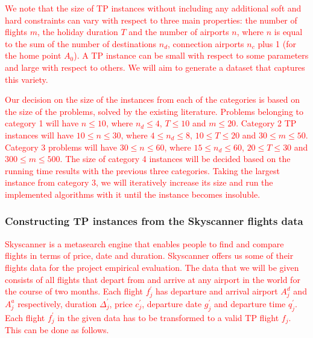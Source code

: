 \documentclass{mprop}
\theoremstyle{definition}
\begin{document}
\textcolor{red}{
We note that the size of TP instances without including any additional soft and hard constraints can vary with respect to three main properties: the number of flights $m$, the holiday duration $T$ and the number of airports $n$, where $n$ is equal to the sum of the number of destinations $n_{d}$, connection airports $n_{c}$ plus 1 (for the home point $A_{0}$). A TP instance can be small with respect to some parameters and large with respect to others. We will aim to generate a dataset that captures this variety.}%

\textcolor{red}{
Our decision on the size of the instances from each of the categories is based on  the size of the problems, solved by the existing literature. Problems belonging to category 1 will have $n \leq 10$, where $n_{d} \leq 4$, $T \leq 10$ and $m \leq 20$. Category 2 TP instances will have $10 \leq n \leq 30$, where $4 \leq n_{d} \leq 8$, $10 \leq T \leq 20$ and $30 \leq m \leq 50$. Category 3 problems will have $30 \leq n \leq 60$, where $15 \leq n_{d} \leq 60$, $20 \leq T \leq 30$ and $300 \leq m \leq 500$. The size of category 4 instances will be decided based on the running time results with the previous three categories. Taking the largest instance from category 3, we will iteratively increase its size and run the implemented algorithms with it until the instance becomes insoluble.}


\subsubsection*{Constructing TP instances from the Skyscanner flights data}
\textcolor{red}{
Skyscanner is a metasearch engine that enables people to find and compare flights in terms of price, date and duration. Skyscanner offers us some of their flights data for the project empirical evaluation. The data that we will be given consists of all flights that depart from and arrive at any airport in the world for the course of two months. Each flight $f^{\prime}_{j}$ has departure and arrival airport $A^{d}_{j}$ and $A^{a}_{j}$ respectively, duration $\Delta^{\prime}_{j}$, price $c^{\prime}_{j}$, departure date $g^{\prime}_{j}$ and departure time $q^{\prime}_{j}$. Each flight $f^{\prime}_{j}$ in the given data has to be transformed to a valid TP flight $f_{j}$. This can be done as follows.}
\end{document}
